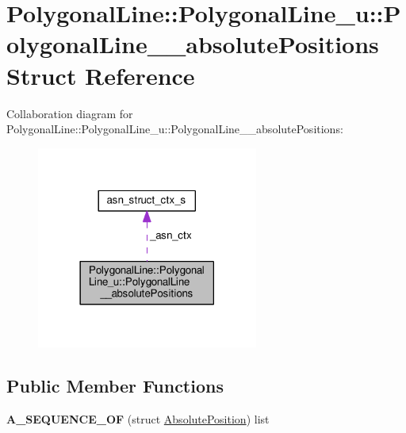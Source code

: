 \hypertarget{structPolygonalLine_1_1PolygonalLine__u_1_1PolygonalLine____absolutePositions}{}\section{Polygonal\+Line\+:\+:Polygonal\+Line\+\_\+u\+:\+:Polygonal\+Line\+\_\+\+\_\+absolute\+Positions Struct Reference}
\label{structPolygonalLine_1_1PolygonalLine__u_1_1PolygonalLine____absolutePositions}


Collaboration diagram for Polygonal\+Line\+:\+:Polygonal\+Line\+\_\+u\+:\+:Polygonal\+Line\+\_\+\+\_\+absolute\+Positions\+:\nopagebreak
\begin{figure}[H]
\begin{center}
\leavevmode
\includegraphics[width=206pt]{structPolygonalLine_1_1PolygonalLine__u_1_1PolygonalLine____absolutePositions__coll__graph}
\end{center}
\end{figure}
\subsection*{Public Member Functions}
\begin{DoxyCompactItemize}
\item 
{\bfseries A\+\_\+\+S\+E\+Q\+U\+E\+N\+C\+E\+\_\+\+OF} (struct \hyperlink{structAbsolutePosition}{Absolute\+Position}) list\hypertarget{structPolygonalLine_1_1PolygonalLine__u_1_1PolygonalLine____absolutePositions_ab1495897de8fe8c0c315770c4457d00b}{}\label{structPolygonalLine_1_1PolygonalLine__u_1_1PolygonalLine____absolutePositions_ab1495897de8fe8c0c315770c4457d00b}

\end{DoxyCompactItemize}
